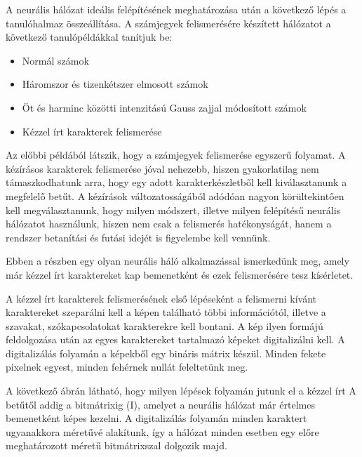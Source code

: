 A neurális hálózat ideális felépítésének meghatározása után a következő lépés a tanulóhalmaz összeállítása. A számjegyek felismerésére készített hálózatot a következő tanulópéldákkal tanítjuk be: 

\begin{itemize}
\item Normál számok 
\item Háromszor és tizenkétszer elmosott számok 
\item Öt és harminc közötti intenzitású Gauss zajjal módosított számok
\item Kézzel írt karakterek felismerése
\end{itemize}

Az előbbi példából látszik, hogy a számjegyek felismerése egyszerű folyamat. A kézírásos karakterek felismerése jóval nehezebb, hiszen gyakorlatilag nem támaszkodhatunk arra, hogy egy adott karakterkészletből kell kiválasztanunk a megfelelő betűt. A kézírások változatosságából adódóan nagyon körültekintően kell megválasztanunk, hogy milyen módszert, illetve milyen felépítésű neurális hálózatot használunk, hiszen nem csak a felismerés hatékonyságát, hanem a rendszer betanítási és futási idejét is figyelembe kell vennünk. 

Ebben a részben egy olyan neurális háló alkalmazással ismerkedünk meg, amely már kézzel írt karaktereket kap bemenetként és ezek felismerésére tesz kísérletet. 

A kézzel írt karakterek felismerésének első lépéseként a felismerni kívánt karaktereket szeparálni kell a képen található többi információtól, illetve a szavakat, szókapcsolatokat karakterekre kell bontani. A kép ilyen formájú feldolgozása után az egyes karaktereket tartalmazó képeket digitalizálni kell. A digitalizálás folyamán a képekből egy bináris mátrix készül. Minden fekete pixelnek egyest, minden fehérnek nullát feleltetünk meg. 

A következő ábrán látható, hogy milyen lépések folyamán jutunk el a kézzel írt A betűtől addig a bitmátrixig (I), amelyet a neurális hálózat már értelmes bemenetként képes kezelni. A digitalizálás folyamán minden karaktert ugyanakkora méretűvé alakítunk, így a hálózat minden esetben egy előre meghatározott méretű bitmátrixszal dolgozik majd. 